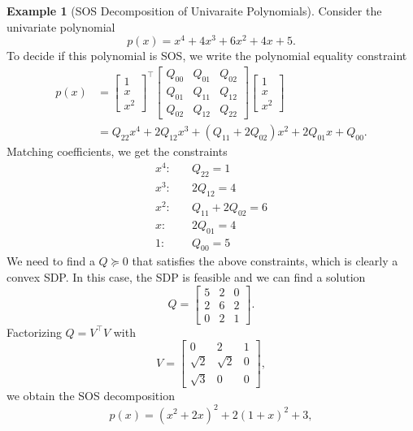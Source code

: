 \documentclass[
]{book}
\theoremstyle{definition}
\theoremstyle{definition}
\newtheorem{example}{Example}[chapter]
\theoremstyle{definition}
\theoremstyle{definition}
\theoremstyle{remark}
\begin{document}
\begin{example}[SOS Decomposition of Univaraite Polynomials]
\protect\hypertarget{exm:SOSDecompositionUnivariate}{}\label{exm:SOSDecompositionUnivariate}Consider the univariate polynomial
\[
p(x) = x^4 + 4 x^3 + 6 x^2 + 4 x + 5.
\]
To decide if this polynomial is SOS, we write the polynomial equality constraint
\begin{equation}
\begin{split}
p(x) & = \begin{bmatrix} 1 \\ x \\ x^2 \end{bmatrix}^\top\begin{bmatrix} Q_{00} & Q_{01} & Q_{02} \\
Q_{01} & Q_{11} & Q_{12} \\
Q_{02} & Q_{12} & Q_{22} 
\end{bmatrix}  \begin{bmatrix} 1 \\ x \\ x^2 \end{bmatrix} \\
& = Q_{22} x^4 + 2 Q_{12} x^3 + (Q_{11} + 2 Q_{02}) x^2 + 2 Q_{01} x + Q_{00}.
\end{split}
\end{equation}
Matching coefficients, we get the constraints
\begin{equation}
\begin{split}
x^4: & \quad Q_{22} = 1\\
x^3: & \quad 2 Q_{12} = 4\\
x^2: & \quad Q_{11} + 2 Q_{02} = 6\\
x: & \quad 2Q_{01} = 4\\
1: & \quad Q_{00} = 5
\end{split}
\end{equation}
We need to find a \(Q \succeq 0\) that satisfies the above constraints, which is clearly a convex SDP. In this case, the SDP is feasible and we can find a solution
\[
Q = \begin{bmatrix} 5 & 2 & 0 \\ 2 & 6 & 2 \\ 0 & 2 & 1 \end{bmatrix}.
\]
Factorizing \(Q=V^\top V\) with
\[
V = \begin{bmatrix} 0 & 2 & 1 \\ \sqrt{2} & \sqrt{2} & 0 \\ \sqrt{3} & 0 & 0 \end{bmatrix},
\]
we obtain the SOS decomposition
\[
p(x) = (x^2 + 2x)^2 + 2 (1+x)^2 + 3,
\]
\end{example}
\end{document}
